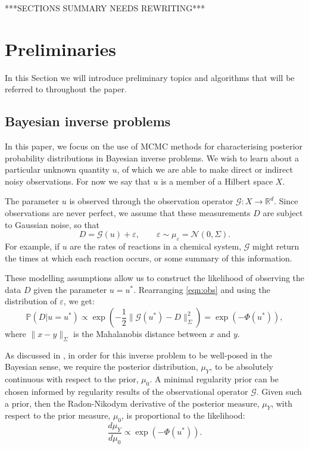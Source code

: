 \documentclass[final]{siamltex}
\newcommand{\G}{\mathcal{G}}
\newcommand{\data}{D}
\begin{document}
***SECTIONS SUMMARY NEEDS REWRITING***

\section{Preliminaries}\label{Sec:Prelim}
In this Section we will introduce preliminary topics and algorithms
that will be referred to throughout the paper.
\subsection{Bayesian inverse problems}
In this paper, we focus on the use of MCMC methods for characterising
posterior probability distributions in Bayesian inverse problems. We
wish to learn about a particular unknown quantity $u$, of which we are
able to make direct or indirect noisy observations. For now
we say that $u$ is a member of a Hilbert
space $X$. 

The parameter $u$ is observed
through the observation operator $\mathcal{G}:X \to\mathbb{R}^d$. 
Since observations are never perfect, we
assume that these measurements $\data$ are subject to Gaussian noise, so that
\begin{equation}\label{eqn:obs}
	\data = \mathcal{G}(u) + \varepsilon, \qquad \varepsilon \sim \mu_{\varepsilon} = \mathcal{N}(0,\Sigma).
\end{equation}
For example, if $u$ are the rates of reactions in a chemical system, $\G$ might return the times at which each reaction occurs, or some summary of this information.

These modelling assumptions allow us to construct the 
likelihood of observing the data $\data$ given the parameter $u =
u^*$. Rearranging \eqref{eqn:obs} and using the distribution of $\varepsilon$, we get:
\begin{equation}\label{eqn:like}
	\mathbb{P}(\data|u=u^*) \propto \exp \left ( -\frac{1}{2} \|\mathcal{G}(u^*)
	  - \data\|_\Sigma^2 \right ) = \exp\left(-\Phi(u^*)\right),
\end{equation}
where $\| x - y \|_\Sigma$ is the Mahalanobis distance between $x$ and $y$.

As discussed in \cite{stuart2010inverse,cotter2009bayesian},
in order for this inverse problem to be well-posed in the Bayesian
sense, we require the posterior distribution, $\mu_Y$, to be absolutely
continuous with respect to the prior, $\mu_0$. A
minimal regularity prior can be chosen informed by regularity results
of the observational operator $\mathcal{G}$. Given such a prior, then
the Radon-Nikodym derivative of the posterior measure, $\mu_Y$, with
respect to the prior measure, $\mu_0$, is proportional to the
likelihood:
\begin{equation}\label{eqn:RND}
	\frac{d\mu_Y}{d\mu_0} \propto \exp \left ( -\Phi(u^*) \right ).
\end{equation}
\end{document}
